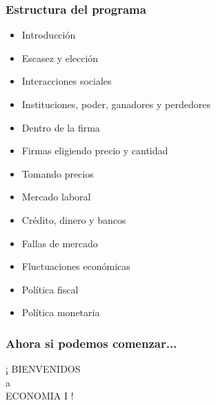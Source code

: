 \documentclass{beamer}
\begin{document}
\begin{frame}
\frametitle{Estructura del programa}
\begin{itemize}
    \item Introducción
    \item Escasez y elección
    \item Interacciones sociales
    \item Instituciones, poder, ganadores y perdedores
    \item Dentro de la firma
    \item Firmas eligiendo precio y cantidad
    \item Tomando precios
    \item Mercado laboral
    \item Crédito, dinero y bancos
    \item Fallas de mercado
    \item Fluctuaciones económicas
    \item Política fiscal
    \item Política monetaria
\end{itemize}
\end{frame}

\begin{frame}
\frametitle{Ahora si podemos comenzar...}
\centering
\huge
¡ BIENVENIDOS \\ \vspace{3mm} a \\ \vspace{3mm} ECONOMIA I !
\end{frame}
\end{document}
